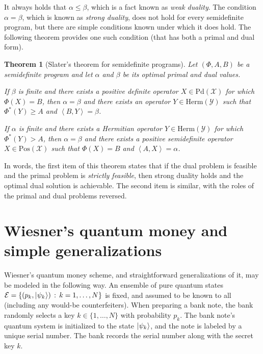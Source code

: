 \documentclass[11pt,letterpaper]{article}
\newtheorem{theorem}{Theorem}
\theoremstyle{definition}
\newcommand{\microspace}{\mspace{0.5mu}}
\newcommand{\ip}[2]{\left\langle #1 , #2\right\rangle}
\newcommand{\setft}[1]{\mathrm{#1}}
\newcommand{\herm}[1]{\setft{Herm}\left(#1\right)}
\newcommand{\pos}[1]{\setft{Pos}\left(#1\right)}
\newcommand{\pd}[1]{\setft{Pd}\left(#1\right)}
\def \lket {\left|}
\def \rket {\right\rangle}
\newcommand{\ket}[1]{\lket\microspace #1 \microspace\rket}
\newenvironment{mylist}[1]{\begin{list}{}{
	\setlength{\leftmargin}{#1}
	\setlength{\rightmargin}{0mm}
	\setlength{\labelsep}{2mm}
	\setlength{\labelwidth}{8mm}
	\setlength{\itemsep}{0mm}}}
	{\end{list}}
\def\X{\mathcal{X}}
\def\Y{\mathcal{Y}}
\def\E{\mathcal{E}}
\begin{document}
It always holds that $\alpha \leq \beta$, which is a fact known as
\emph{weak duality}.
The condition $\alpha = \beta$, which is known as 
\emph{strong duality}, does not hold for every semidefinite program,
but there are simple conditions known under which it does hold.
The following theorem provides one such condition (that has both a
primal and dual form).

\begin{theorem}[Slater's theorem for semidefinite programs]
  \label{theorem:Slater}
Let $(\Phi,A,B)$ be a semidefinite program and let $\alpha$ and
$\beta$ be its optimal primal and dual values.
\begin{mylist}{\parindent}
\item[1.]
  If $\beta$ is finite and there exists a positive definite operator
  $X\in\pd{\X}$ for which $\Phi(X) = B$,
  then $\alpha = \beta$ and there exists an operator $Y\in\herm{\Y}$
  such that $\Phi^{\ast}(Y)\geq A$ and $\ip{B}{Y} = \beta$.
\item[2.]
  If $\alpha$ is finite and there exists a Hermitian operator
  $Y\in\herm{\Y}$ for which $\Phi^{\ast}(Y) > A$,
  then $\alpha = \beta$ and there exists a positive semidefinite 
  operator $X\in\pos{\X}$ such that $\Phi(X)=B$ and 
  $\ip{A}{X} = \alpha$.
\end{mylist}
\end{theorem}

In words, the first item of this theorem states that if the dual
problem is feasible and the primal problem is 
\emph{strictly feasible}, then strong duality holds and the optimal
dual solution is achievable.
The second item is similar, with the roles of the primal and dual
problems reversed.

\section{Wiesner's quantum money and simple generalizations
  \label{sec:generalized-schemes}} 

Wiesner's quantum money scheme, and straightforward generalizations of
it, may be modeled in the following way.
An ensemble of pure quantum states
$\E = \left\{ (p_k,\ket{\psi_k})\,:\,k = 1,\ldots,N\right\}$
is fixed, and assumed to be known to all (including any would-be
counterfeiters).
When preparing a bank note, the bank randomly selects a key
$k\in\{1,\ldots,N\}$ with probability $p_k$.
The bank note's quantum system is initialized to the state
$\ket{\psi_k}$, and the note is labeled by a unique serial number.
The bank records the serial number along with the secret key $k$.
\end{document}
